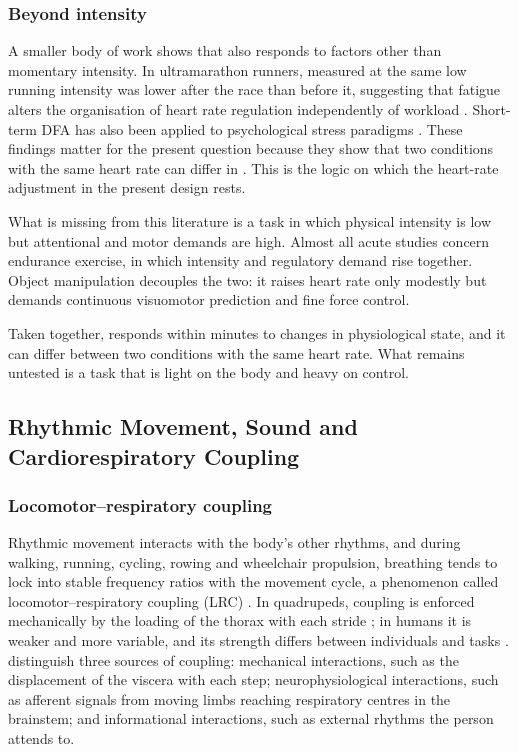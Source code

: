 \subsubsection{Beyond intensity}

A smaller body of work shows that \al{} also responds to factors other than momentary intensity. In ultramarathon runners, \al{} measured at the same low running intensity was lower after the race than before it, suggesting that fatigue alters the organisation of heart rate regulation independently of workload \citep{rogers2021fatigue}. Short-term DFA has also been applied to psychological stress paradigms . These findings matter for the present question because they show that two conditions with the same heart rate can differ in \al. This is the logic on which the heart-rate adjustment in the present design rests.

What is missing from this literature is a task in which physical intensity is low but attentional and motor demands are high. Almost all acute \al{} studies concern endurance exercise, in which intensity and regulatory demand rise together. Object manipulation decouples the two: it raises heart rate only modestly but demands continuous visuomotor prediction and fine force control.

Taken together, \al{} responds within minutes to changes in physiological state, and it can differ between two conditions with the same heart rate. What remains untested is a task that is light on the body and heavy on control.

\subsection{Rhythmic Movement, Sound and Cardiorespiratory Coupling}
\label{sec:bg-coupling}

\subsubsection{Locomotor--respiratory coupling}

Rhythmic movement interacts with the body's other rhythms, and during walking, running, cycling, rowing and wheelchair propulsion, breathing tends to lock into stable frequency ratios with the movement cycle, a phenomenon called locomotor--respiratory coupling (LRC) \citep{bramble1983,bernasconi1993}. In quadrupeds, coupling is enforced mechanically by the loading of the thorax with each stride \citep{bramble1983}; in humans it is weaker and more variable, and its strength differs between individuals and tasks \citep{bernasconi1993}. \citet{bardy2015} distinguish three sources of coupling: mechanical interactions, such as the displacement of the viscera with each step; neurophysiological interactions, such as afferent signals from moving limbs reaching respiratory centres in the brainstem; and informational interactions, such as external rhythms the person attends to.

